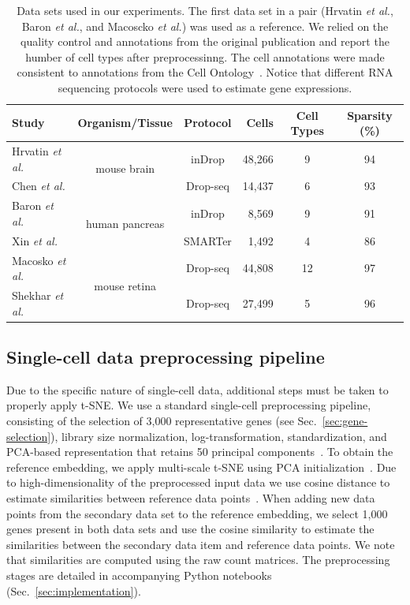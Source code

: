 \documentclass[runningheads]{llncs}
\newcommand{\etal}{\textit{et al.}}
\begin{document}
\vspace{-3mm}
\begin{table}[ht]
\begin{center}
\setlength\tabcolsep{4pt}
\begin{tabular}{l c c r c c}
\toprule
Study & Organism/Tissue & Protocol & Cells & Cell Types & Sparsity (\%) \\
\midrule
Hrvatin \etal & \multirow{2}{*}{mouse brain} & inDrop & 48,266 & 9 & 94 \\
Chen \etal & & Drop-seq & 14,437 & 6 & 93 \\[5pt]
Baron \etal & \multirow{2}{*}{human pancreas} & inDrop & 8,569 & 9 & 91 \\
Xin \etal & & SMARTer & 1,492 & 4 & 86 \\[5pt]
Macosko \etal & \multirow{2}{*}{mouse retina} & Drop-seq & 44,808 & 12 & 97 \\
Shekhar \etal & & Drop-seq & 27,499 & 5 & 96 \\
\bottomrule
\end{tabular}
\end{center}
\caption{Data sets used in our experiments. The first data set in a pair
(Hrvatin \etal, Baron \etal, and Macoscko \etal) was used as a reference. 
We relied on the quality control and annotations from the original
publication and report the humber of cell types after preprocessinng. 
The cell annotations were made consistent to
annotations from the Cell Ontology~\cite{cell_ontology}. Notice that
different RNA sequencing protocols were used to estimate gene expressions.}
\label{tab:data sets}
\end{table}

\subsection{Single-cell data preprocessing pipeline}

Due to the specific nature of single-cell data, additional steps must be taken
to properly apply t-SNE. We use a standard single-cell preprocessing pipeline,
consisting of the selection of 3,000 representative genes (see
Sec.~\ref{sec:gene-selection}), library size normalization, log-transformation,
standardization, and PCA-based representation that retains 50 principal
components~\cite{seurat,scanpy}. To obtain the reference embedding, we apply
multi-scale t-SNE using PCA initialization~\cite{art_of_using_tsne}. Due to
high-dimensionality of the preprocessed input data we use cosine distance to
estimate similarities between reference data points~\cite{Domingos2012-CACM}.
When adding new data points from the secondary data set to the reference embedding,
we select 1,000 genes present in both data sets and use the cosine similarity 
to estimate the similarities between the secondary data item and reference data
points.  We note that similarities are computed using the raw count matrices.
The preprocessing stages are detailed in accompanying Python notebooks
(Sec.~\ref{sec:implementation}).
\end{document}
